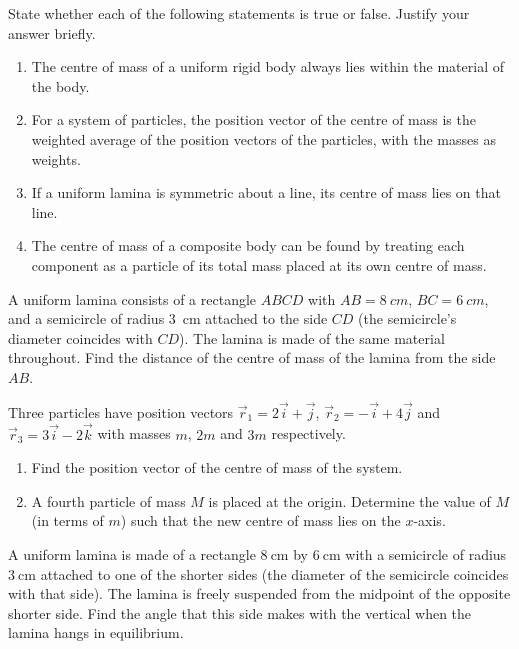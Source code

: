 \documentclass[11pt]{article}
\newcounter{popsec}
\newcounter{popsub}
\newcommand{\courssub}[1]{%
  \stepcounter{popsub}%
  \par\vspace{9pt}\noindent{\popxbold\fontsize{11.5}{13}\selectfont\color{popink}{\color{poporange}\thepopsec.\thepopsub}\hspace{6pt}#1}\par\nopagebreak\vspace{4pt}
}
\begin{document}
\begin{exercice}
State whether each of the following statements is true or false. Justify your answer briefly.
\begin{enumerate}
\item The centre of mass of a uniform rigid body always lies within the material of the body.
\item For a system of particles, the position vector of the centre of mass is the weighted average of the position vectors of the particles, with the masses as weights.
\item If a uniform lamina is symmetric about a line, its centre of mass lies on that line.
\item The centre of mass of a composite body can be found by treating each component as a particle of its total mass placed at its own centre of mass.
\end{enumerate}
\end{exercice}

\begin{exercice}
A uniform lamina consists of a rectangle $ABCD$ with $AB = \SI{8}{cm}$, $BC = \SI{6}{cm}$, and a semicircle of radius \SI{3}{cm} attached to the side $CD$ (the semicircle's diameter coincides with $CD$). The lamina is made of the same material throughout.  
Find the distance of the centre of mass of the lamina from the side $AB$.
\end{exercice}

\begin{exercice}
Three particles have position vectors $\vec{r}_1 = 2\vec{i} + \vec{j}$, $\vec{r}_2 = -\vec{i} + 4\vec{j}$ and $\vec{r}_3 = 3\vec{i} - 2\vec{k}$ with masses $m$, $2m$ and $3m$ respectively.  
\begin{enumerate}
\item Find the position vector of the centre of mass of the system.
\item A fourth particle of mass $M$ is placed at the origin. Determine the value of $M$ (in terms of $m$) such that the new centre of mass lies on the $x$-axis.
\end{enumerate}
\end{exercice}

\courssub{I practise}

\begin{exercice}
A uniform lamina is made of a rectangle $8\ \mathrm{cm}$ by $6\ \mathrm{cm}$ with a semicircle of radius $3\ \mathrm{cm}$ attached to one of the shorter sides (the diameter of the semicircle coincides with that side). The lamina is freely suspended from the midpoint of the opposite shorter side. Find the angle that this side makes with the vertical when the lamina hangs in equilibrium.
\end{exercice}
\end{document}

